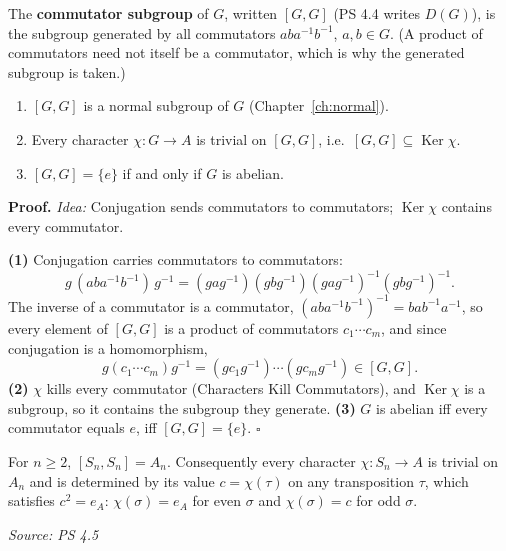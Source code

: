 \documentclass[11pt]{report}
\renewenvironment{proof}[1][Proof]{\noindent\textbf{#1.} }{\hfill$\square$\par\vspace{5pt}}
\newcommand{\srcline}[1]{\par\hfill{\footnotesize\textit{Source: #1}}}
\begin{document}
\begin{defbox}\label{def:commutator-subgroup}
The \textbf{commutator subgroup} of $G$, written $[G,G]$ (PS 4.4 writes $D(G)$), is the subgroup generated by all commutators $aba^{-1}b^{-1}$, $a, b \in G$. (A product of commutators need not itself be a commutator, which is why the generated subgroup is taken.)
\end{defbox}

\begin{propbox}\label{prop:properties-commutator-subgroup}
\begin{enumerate}
    \item $[G,G]$ is a normal subgroup of $G$ (Chapter~\ref{ch:normal}).
    \item Every character $\chi: G \to A$ is trivial on $[G,G]$, i.e.\ $[G,G] \subseteq \operatorname{Ker}\chi$.
    \item $[G,G] = \{e\}$ if and only if $G$ is abelian.
\end{enumerate}
\end{propbox}

\begin{proof}
\textit{Idea:} Conjugation sends commutators to commutators; $\operatorname{Ker}\chi$ contains every commutator.\par
\textbf{(1)} Conjugation carries commutators to commutators:
\[ g\,(aba^{-1}b^{-1})\,g^{-1} = (gag^{-1})(gbg^{-1})(gag^{-1})^{-1}(gbg^{-1})^{-1}. \]
The inverse of a commutator is a commutator, $(aba^{-1}b^{-1})^{-1} = bab^{-1}a^{-1}$, so every element of $[G,G]$ is a product of commutators $c_1 \cdots c_m$, and since conjugation is a homomorphism,
\[ g(c_1 \cdots c_m)g^{-1} = (gc_1g^{-1}) \cdots (gc_mg^{-1}) \in [G,G]. \] \textbf{(2)} $\chi$ kills every commutator (Characters Kill Commutators), and $\operatorname{Ker}\chi$ is a subgroup, so it contains the subgroup they generate. \textbf{(3)} $G$ is abelian iff every commutator equals $e$, iff $[G,G] = \{e\}$.
\end{proof}

\begin{thmbox}\label{thm:commutator-subgroup-sn}
For $n \geq 2$, $[S_n, S_n] = A_n$. Consequently every character $\chi: S_n \to A$ is trivial on $A_n$ and is determined by its value $c = \chi(\tau)$ on any transposition $\tau$, which satisfies $c^2 = e_A$: $\chi(\sigma) = e_A$ for even $\sigma$ and $\chi(\sigma) = c$ for odd $\sigma$.
\srcline{PS 4.5}
\end{thmbox}
\end{document}
